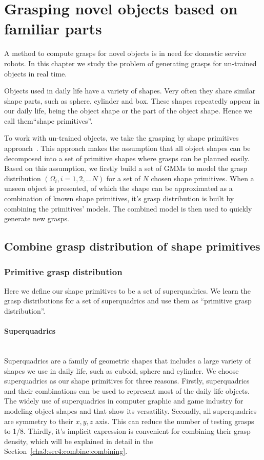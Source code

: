 \section{Grasping novel objects based on familiar parts}
\label{cha3:sec4}
A method to compute grasps for novel objects is in need for domestic service robots. In this chapter we study the problem of generating grasps for un-trained objects in real time.

Objects used in daily life have a variety of shapes. Very often they share similar shape parts, such as sphere, cylinder and box. These shapes repeatedly appear in our daily life, being the object shape or the part of the object shape. Hence we call them``shape primitives''.

To work with un-trained objects, we take the grasping by shape primitives approach~\citep{miller2003automatic}. This approach makes the assumption that all object shapes can be decomposed into a set of primitive shapes where grasps can be planned easily. Based on this assumption, we firstly build a set of GMMs to model the grasp distribution $\left(\Omega_i, i=1,2,...N\right)$ for a set of $N$ chosen shape primitives. When a unseen object is presented, of which the shape can be approximated as a combination of known shape primitives, it's grasp distribution is built by combining the primitives' models. The combined model is then used to quickly generate new grasps.

\subsection{Combine grasp distribution of shape primitives}
\label{cha3:sec4:combine}

\subsubsection{Primitive grasp distribution}
\label{cha3:sec4:combine:primitivegraspdistribution}
Here we define our shape primitives to be a set of superquadrics. We learn the grasp distributions for a set of superquadrics and use them as ``primitive grasp distribution''.


\paragraph{Superquadrics} ~\\
\label{cha3:sec4:combine:primitivegraspdistribution:sq}
Superquadrics are a family of geometric shapes that includes a large variety of shapes we use in daily life, such as cuboid, sphere and cylinder. We choose superquadrics as our shape primitives for three reasons. Firstly, superquadrics and their combinations can be used to represent most of the daily life objects. The widely use of superquadrics in computer graphic and game industry for modeling object shapes and that show its versatility. Secondly, all superquadrics are symmetry to their $x, y, z$ axis. This can reduce the number of testing grasps to 1/8. Thirdly, it's implicit expression is convenient for combining their grasp density, which will be explained in detail in the Section~\ref{cha3:sec4:combine:combining}.

